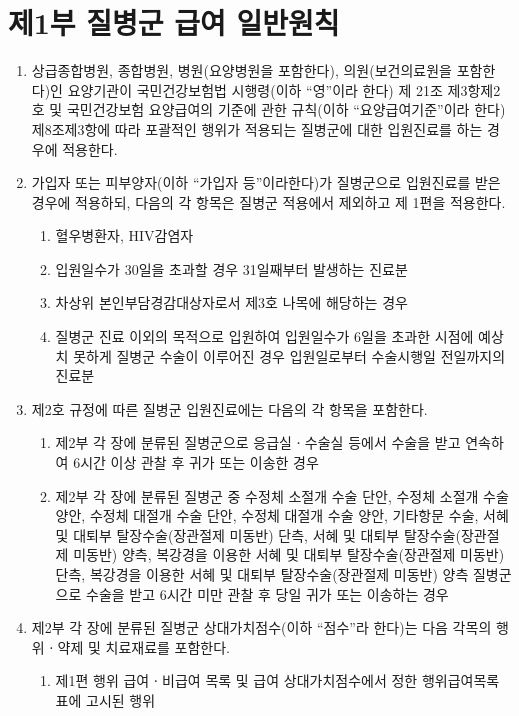 \section{제1부 질병군 급여 일반원칙}
\begin{enumerate}[1.]\tightlist
\item 상급종합병원, 종합병원, 병원(요양병원을 포함한다), 의원(보건의료원을 포함한다)인 요양기관이 국민건강보험법 시행령(이하 “영”이라 한다) 제 21조 제3항제2호 및 국민건강보험 요양급여의 기준에 관한 규칙(이하 “요양급여기준”이라 한다) 제8조제3항에 따라 포괄적인 행위가 적용되는 질병군에 대한 입원진료를 하는 경우에 적용한다.
\item 가입자 또는 피부양자(이하 “가입자 등”이라한다)가 질병군으로 입원진료를 받은 경우에 적용하되, 다음의 각 항목은 질병군 적용에서 제외하고 제 1편을 적용한다.
	\begin{enumerate}[가.]\tightlist
	\item 혈우병환자, HIV감염자
	\item 입원일수가 30일을 초과할 경우 31일째부터 발생하는 진료분
	\item 차상위 본인부담경감대상자로서 제3호 나목에 해당하는 경우
	\item 질병군 진료 이외의 목적으로 입원하여 입원일수가 6일을 초과한 시점에 예상치 못하게 질병군 수술이 이루어진 경우 입원일로부터 수술시행일 전일까지의 진료분
	\end{enumerate}
\item 제2호 규정에 따른 질병군 입원진료에는 다음의 각 항목을 포함한다.
	\begin{enumerate}[가.]\tightlist
	\item 제2부 각 장에 분류된 질병군으로 응급실ㆍ수술실 등에서 수술을 받고 연속하여 6시간 이상 관찰 후 귀가 또는 이송한 경우
	\item 제2부 각 장에 분류된 질병군 중 수정체 소절개 수술 단안, 수정체 소절개 수술 양안, 수정체 대절개 수술 단안, 수정체 대절개 수술 양안, 기타항문 수술, 서혜 및 대퇴부 탈장수술(장관절제 미동반) 단측, 서혜 및 대퇴부 탈장수술(장관절제 미동반) 양측, 복강경을 이용한 서혜 및 대퇴부 탈장수술(장관절제 미동반) 단측, 복강경을 이용한 서혜 및 대퇴부 탈장수술(장관절제 미동반) 양측 질병군으로 수술을 받고 6시간 미만 관찰 후 당일 귀가 또는 이송하는 경우
	\end{enumerate}
\item 제2부 각 장에 분류된 질병군 상대가치점수(이하 “점수”라 한다)는 다음 각목의 행위ㆍ약제 및 치료재료를 포함한다.
	\begin{enumerate}[가.]\tightlist
	\item 제1편 행위 급여ㆍ비급여 목록 및 급여 상대가치점수에서 정한 행위급여목록표에 고시된 행위

\end{enumerate}
\end{enumerate}
